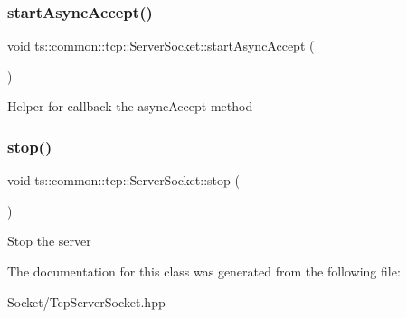 \subsubsection{\texorpdfstring{start\+Async\+Accept()}{startAsyncAccept()}}
{\footnotesize\ttfamily void ts\+::common\+::tcp\+::\+Server\+Socket\+::start\+Async\+Accept (\begin{DoxyParamCaption}{ }\end{DoxyParamCaption})\hspace{0.3cm}{\ttfamily [protected]}}

Helper for callback the async\+Accept method \mbox{\label{classts_1_1common_1_1tcp_1_1_server_socket_a73e30878aabcc2c1f247ae868a3c1688}} 
\subsubsection{\texorpdfstring{stop()}{stop()}}
{\footnotesize\ttfamily void ts\+::common\+::tcp\+::\+Server\+Socket\+::stop (\begin{DoxyParamCaption}{ }\end{DoxyParamCaption})}

Stop the server 

The documentation for this class was generated from the following file\+:\begin{DoxyCompactItemize}
\item 
Socket/Tcp\+Server\+Socket.\+hpp\end{DoxyCompactItemize}
